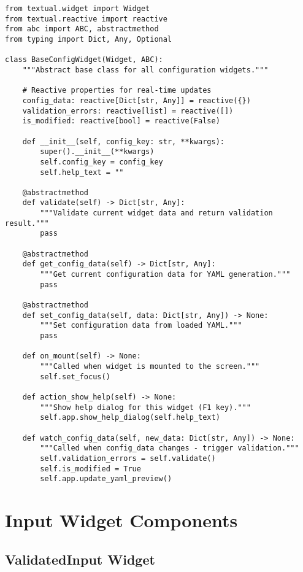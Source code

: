 \documentclass[11pt,a4paper]{article}
\begin{document}
\begin{lstlisting}[caption={BaseConfigWidget Implementation}, label={lst:base_widget}]
from textual.widget import Widget
from textual.reactive import reactive
from abc import ABC, abstractmethod
from typing import Dict, Any, Optional

class BaseConfigWidget(Widget, ABC):
    """Abstract base class for all configuration widgets."""
    
    # Reactive properties for real-time updates
    config_data: reactive[Dict[str, Any]] = reactive({})
    validation_errors: reactive[list] = reactive([])
    is_modified: reactive[bool] = reactive(False)
    
    def __init__(self, config_key: str, **kwargs):
        super().__init__(**kwargs)
        self.config_key = config_key
        self.help_text = ""
        
    @abstractmethod
    def validate(self) -> Dict[str, Any]:
        """Validate current widget data and return validation result."""
        pass
        
    @abstractmethod
    def get_config_data(self) -> Dict[str, Any]:
        """Get current configuration data for YAML generation."""
        pass
        
    @abstractmethod
    def set_config_data(self, data: Dict[str, Any]) -> None:
        """Set configuration data from loaded YAML."""
        pass
        
    def on_mount(self) -> None:
        """Called when widget is mounted to the screen."""
        self.set_focus()
        
    def action_show_help(self) -> None:
        """Show help dialog for this widget (F1 key)."""
        self.app.show_help_dialog(self.help_text)
        
    def watch_config_data(self, new_data: Dict[str, Any]) -> None:
        """Called when config_data changes - trigger validation."""
        self.validation_errors = self.validate()
        self.is_modified = True
        self.app.update_yaml_preview()
\end{lstlisting}

\section{Input Widget Components}

\subsection{ValidatedInput Widget}
\end{document}
